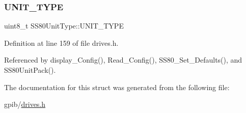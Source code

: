\mbox{\label{structSS80UnitType_ae00e42430682e849d83b1ca4c8f44013}} 
\subsubsection{\texorpdfstring{U\+N\+I\+T\+\_\+\+T\+Y\+PE}{UNIT\_TYPE}}
{\footnotesize\ttfamily uint8\+\_\+t S\+S80\+Unit\+Type\+::\+U\+N\+I\+T\+\_\+\+T\+Y\+PE}



Definition at line 159 of file drives.\+h.



Referenced by display\+\_\+\+Config(), Read\+\_\+\+Config(), S\+S80\+\_\+\+Set\+\_\+\+Defaults(), and S\+S80\+Unit\+Pack().



The documentation for this struct was generated from the following file\+:\begin{DoxyCompactItemize}
\item 
gpib/\hyperlink{drives_8h}{drives.\+h}\end{DoxyCompactItemize}
